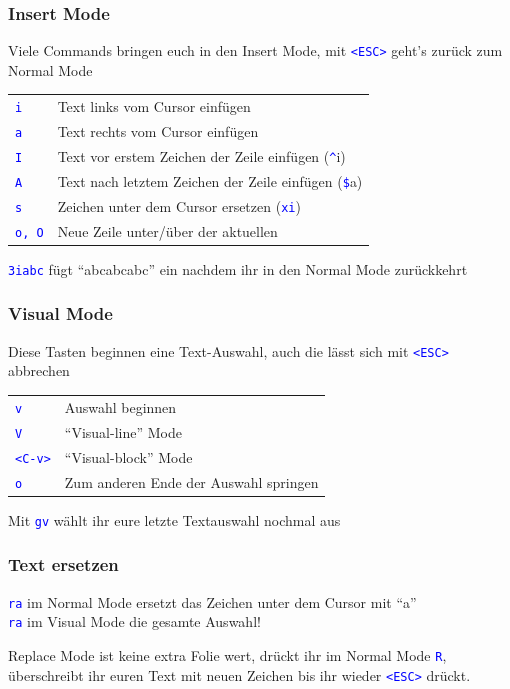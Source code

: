 \documentclass{beamer}
\newcommand{\cmd}[1]{\textcolor{blue}{\texttt{#1}}}
\begin{document}
\begin{frame}
  \frametitle{Insert Mode}
  Viele Commands bringen euch in den Insert Mode, mit \cmd{<ESC>} geht's zurück zum Normal Mode \\[0.5cm]

  \begin{tabular}{l | l}
    \cmd{i} & Text links vom Cursor einfügen \\[0.2cm]
    \cmd{a} & Text rechts vom Cursor einfügen \\[0.2cm]
    \cmd{I} & Text vor erstem Zeichen der Zeile einfügen (\cmd \^{}i) \\[0.2cm]
    \cmd{A} & Text nach letztem Zeichen der Zeile einfügen (\cmd \$a) \\[0.2cm]
    \cmd{s} & Zeichen unter dem Cursor ersetzen (\cmd{xi}) \\[0.2cm]
    \cmd{o, O} & Neue Zeile unter/über der aktuellen \\[0.2cm]
  \end{tabular}

  \vspace{0.5cm}

  \cmd{3iabc} fügt \enquote{abcabcabc} ein nachdem ihr in den Normal Mode zurückkehrt
\end{frame}

\begin{frame}
  \frametitle{Visual Mode}
  Diese Tasten beginnen eine Text-Auswahl, auch die lässt sich mit \cmd{<ESC>} abbrechen \\[0.5cm]

  \begin{tabular}{l | l}
    \cmd{v} & Auswahl beginnen \\[0.2cm]
    \cmd{V} & \enquote{Visual-line} Mode \\[0.2cm]
    \cmd{<C-v>} & \enquote{Visual-block} Mode \\[0.2cm]
    \cmd{o} & Zum anderen Ende der Auswahl springen \\[0.2cm]
  \end{tabular}

  \vspace{0.5cm}

  Mit \cmd{gv} wählt ihr eure letzte Textauswahl nochmal aus

\end{frame}

  \begin{frame}
    \frametitle{Text ersetzen}

    \cmd{ra} im Normal Mode ersetzt das Zeichen unter dem Cursor mit \enquote{a} \\[0.3cm]
  \cmd{ra} im Visual Mode die gesamte Auswahl!

  \vspace{0.7cm}

  Replace Mode ist keine extra Folie wert, drückt ihr im Normal Mode \cmd{R}, überschreibt ihr euren Text mit neuen Zeichen bis ihr wieder \cmd{<ESC>} drückt.
\end{frame}
\end{document}
